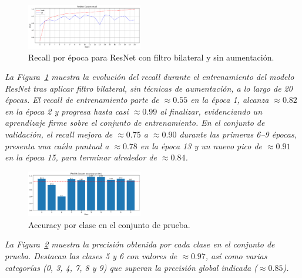 \documentclass[conference]{IEEEtran}
\begin{document}
\begin{figure}[H]
    \centering
    \includegraphics[width=0.45\textwidth]{graphics-resnet-bilateral/resnet_bilateral_without_recall.png}
    \caption{Recall por época para ResNet con filtro bilateral y sin aumentación.}
    \label{fig:resnet_bilateral_without_recall}
\end{figure}
\noindent\textit{%
La Figura~\ref{fig:resnet_bilateral_without_recall} muestra la evolución del recall durante el entrenamiento del modelo ResNet tras aplicar filtro bilateral, sin técnicas de aumentación, a lo largo de 20 épocas. El recall de entrenamiento parte de \(\approx0.55\) en la época 1, alcanza \(\approx0.82\) en la época 2 y progresa hasta casi \(\approx0.99\) al finalizar, evidenciando un aprendizaje firme sobre el conjunto de entrenamiento. En el conjunto de validación, el recall mejora de \(\approx0.75\) a \(\approx0.90\) durante las primeras 6–9 épocas, presenta una caída puntual a \(\approx0.78\) en la época 13 y un nuevo pico de \(\approx0.91\) en la época 15, para terminar alrededor de \(\approx0.84\).
}

\begin{figure}[H]
    \centering
    \includegraphics[width=0.45\textwidth]{graphics-resnet-bilateral/resnet_bilateral_without_class_accuracy.png}
    \caption{Accuracy por clase en el conjunto de prueba.}
    \label{fig:resnet_bilateral_without_class_accuracy}
\end{figure}
\noindent\textit{%
La Figura~\ref{fig:resnet_bilateral_without_class_accuracy} muestra la precisión obtenida por cada clase en el conjunto de prueba. Destacan las clases 5 y 6 con valores de \(\approx0.97\), así como varias categorías (0, 3, 4, 7, 8 y 9) que superan la precisión global indicada (\(\approx0.85\)).
}
\end{document}
